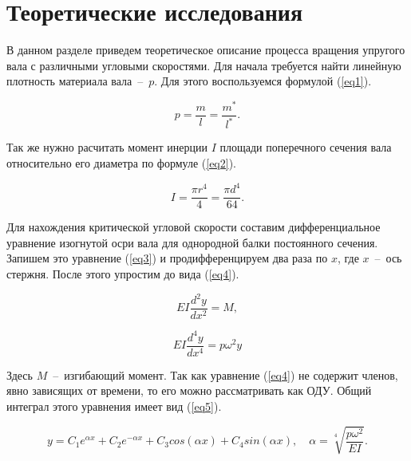 \documentclass[12pt, a4paper]{article}
\begin{document}
    \newpage
    
    \section{Теоретические исследования}
    
    В данном разделе приведем теоретическое описание процесса вращения упругого вала с различными угловыми скоростями. Для начала требуется найти линейную плотность материала вала~--~$p$. Для этого воспользуемся формулой (\ref{eq1}).
    
    \begin{equation}
        p = \frac{m}{l} = \frac{m^{*}}{l^{*}}.
        \label{eq1}
    \end{equation}
    
    Так же нужно расчитать момент инерции $I$ площади поперечного сечения вала относительно его диаметра по формуле (\ref{eq2}).
    
    \begin{equation}
        I = \frac{\pi r^{4}}{4} = \frac{\pi d^{4}}{64}.
        \label{eq2}
    \end{equation}
    
    Для нахождения критической угловой скорости составим дифференциальное уравнение изогнутой осри вала для однородной балки постоянного сечения. Запишем это уравнение (\ref{eq3}) и продифференцируем два раза по $x$, где $x$~--~ось стержня. После этого упростим до вида (\ref{eq4}).
    
    \begin{equation}
        EI \frac{d^{2}y}{dx^{2}} = M,
        \label{eq3}
    \end{equation}
    
    \begin{equation}
        EI \frac{d^{4}y}{dx^{4}} = p \omega^{2} y
        \label{eq4}
    \end{equation}
    
    Здесь $M$~--~изгибающий момент. Так как уравнение (\ref{eq4}) не содержит членов, явно зависящих от времени, то его можно рассматривать как ОДУ. Общий интеграл этого уравнения имеет вид (\ref{eq5}).
    
    \begin{equation}
        y = C_{1} e^{\alpha x} + C_{2} e^{-\alpha x} + C_{3} cos(\alpha x) + C_{4} sin(\alpha x), \quad
        \alpha = \sqrt[4]{\frac{p \omega^{2}}{EI}}.
        \label{eq5}
    \end{equation}
    
\end{document}
